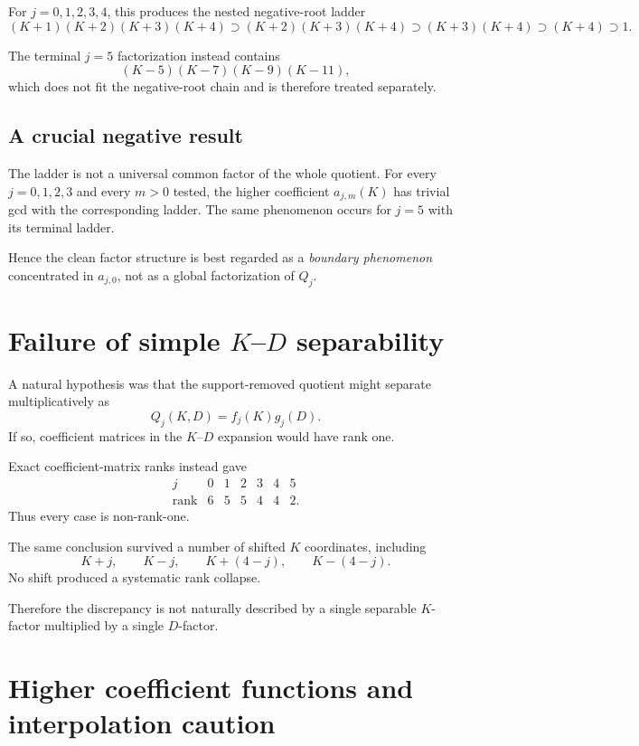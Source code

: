 \documentclass[11pt,a4paper]{article}
\begin{document}
For $j=0,1,2,3,4$, this produces the nested negative-root ladder
\begin{equation}
(K+1)(K+2)(K+3)(K+4)
\supset
(K+2)(K+3)(K+4)
\supset
(K+3)(K+4)
\supset
(K+4)
\supset 1.
\label{eq:ladder}
\end{equation}

The terminal $j=5$ factorization instead contains
\[
(K-5)(K-7)(K-9)(K-11),
\]
which does not fit the negative-root chain and is therefore treated separately.

\subsection{A crucial negative result}

The ladder is not a universal common factor of the whole quotient. For every $j=0,1,2,3$ and every $m>0$ tested, the higher coefficient $a_{j,m}(K)$ has trivial gcd with the corresponding ladder. The same phenomenon occurs for $j=5$ with its terminal ladder.

Hence the clean factor structure is best regarded as a \emph{boundary phenomenon} concentrated in $a_{j,0}$, not as a global factorization of $Q_j$.

\section{Failure of simple $K$--$D$ separability}

A natural hypothesis was that the support-removed quotient might separate multiplicatively as
\[
Q_j(K,D)=f_j(K)g_j(D).
\]
If so, coefficient matrices in the $K$--$D$ expansion would have rank one.

Exact coefficient-matrix ranks instead gave
\[
\begin{array}{c|cccccc}
j&0&1&2&3&4&5\\
\hline
\operatorname{rank}&6&5&5&4&4&2.
\end{array}
\]
Thus every case is non-rank-one.

The same conclusion survived a number of shifted $K$ coordinates, including
\[
K+j,\qquad K-j,\qquad K+(4-j),\qquad K-(4-j).
\]
No shift produced a systematic rank collapse.

Therefore the discrepancy is not naturally described by a single separable $K$-factor multiplied by a single $D$-factor.

\section{Higher coefficient functions and interpolation caution}
\end{document}
